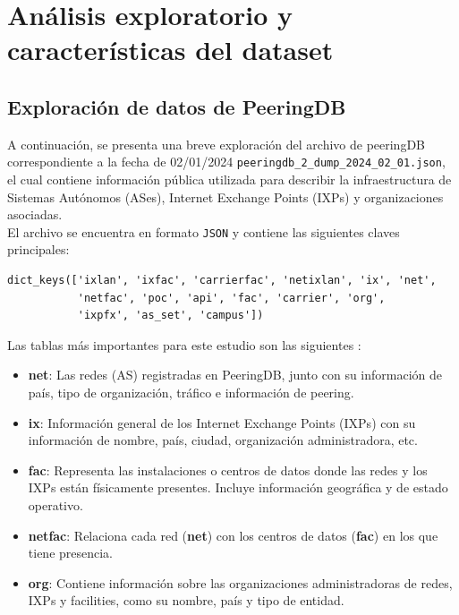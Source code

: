 ﻿\section{Análisis exploratorio y características del dataset} \label{sec:anexo_analisis_exploratorio_caracteristicas_dataset}

\subsection{Exploración de datos de PeeringDB}  \label{sec:anexo_exploracion_datos_peeringdb}





A continuación, se presenta una breve exploración del archivo de peeringDB correspondiente a la fecha de 02/01/2024 
\texttt{peeringdb\_2\_dump\_2024\_02\_01.json}, el cual contiene información pública utilizada para describir la infraestructura de Sistemas Autónomos (ASes), Internet Exchange Points (IXPs) y organizaciones asociadas. \\


El archivo se encuentra en formato \texttt{JSON} y contiene las siguientes claves principales:
\begin{verbatim}
dict_keys(['ixlan', 'ixfac', 'carrierfac', 'netixlan', 'ix', 'net', 
           'netfac', 'poc', 'api', 'fac', 'carrier', 'org', 
           'ixpfx', 'as_set', 'campus'])
\end{verbatim}

Las tablas más importantes para este estudio son las siguientes :
\begin{itemize}
    \item \textbf{net}: Las redes (AS) registradas en PeeringDB, junto con su información  de país, tipo de organización, tráfico e información de peering.
    
    \item \textbf{ix}: Información general de los Internet Exchange Points (IXPs) con su información de nombre, país, ciudad, organización administradora, etc.

    \item \textbf{fac}: Representa las instalaciones o centros de datos donde las redes y los IXPs están físicamente presentes. Incluye información geográfica y de estado operativo.
    
    \item \textbf{netfac}: Relaciona cada red (\textbf{net}) con los centros de datos (\textbf{fac}) en los que tiene presencia.

    \item \textbf{org}: Contiene información sobre las organizaciones administradoras de redes, IXPs y facilities, como su nombre, país y tipo de entidad.

\end{itemize}


